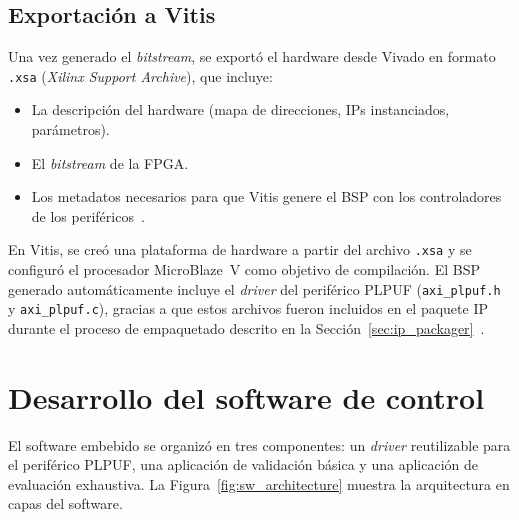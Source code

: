 \subsection{Exportación a Vitis}
\label{sec:export_xsa}

Una vez generado el \textit{bitstream}, se exportó el hardware desde Vivado
en formato \texttt{.xsa} (\textit{Xilinx Support Archive}), que incluye:

\begin{itemize}
  \item La descripción del hardware (mapa de direcciones, IPs instanciados,
    parámetros).
  \item El \textit{bitstream} de la FPGA.
  \item Los metadatos necesarios para que Vitis genere el BSP con los
    controladores de los periféricos~\cite{ug1701}.
\end{itemize}

En Vitis, se creó una plataforma de hardware a partir del archivo
\texttt{.xsa} y se configuró el procesador MicroBlaze~V como objetivo de
compilación. El BSP generado automáticamente incluye el \textit{driver}
del periférico PLPUF (\texttt{axi\_plpuf.h} y \texttt{axi\_plpuf.c}), gracias
a que estos archivos fueron incluidos en el paquete IP durante el proceso de
empaquetado descrito en la Sección~\ref{sec:ip_packager}~\cite{ug1701}.

\section{Desarrollo del software de control}
\label{sec:software}

El software embebido se organizó en tres componentes: un \textit{driver}
reutilizable para el periférico PLPUF, una aplicación de validación básica
y una aplicación de evaluación exhaustiva. La
Figura~\ref{fig:sw_architecture} muestra la arquitectura en capas del
software.

